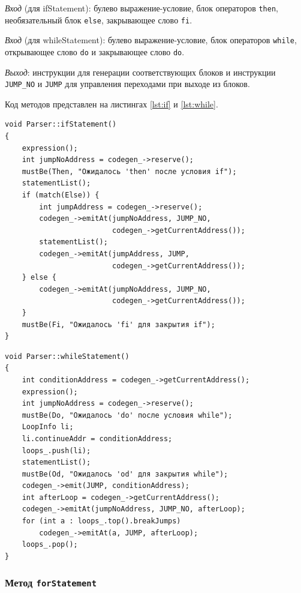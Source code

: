 \documentclass[a4paper,final]{article}
\begin{document}
\textit{Вход} (для ifStatement): булево выражение-условие, блок
операторов \texttt{then}, необязательный блок \texttt{else}, закрывающее
слово \texttt{fi}.

\textit{Вход} (для whileStatement): булево выражение-условие, блок
операторов \texttt{while}, открывающее слово \texttt{do} и закрывающее
слово \texttt{do}.

\textit{Выход}: инструкции для генерации соответствующих блоков и инструкции \texttt{JUMP\_NO} и \texttt{JUMP} для управления переходами при выходе из блоков.

Код методов представлен на листингах \ref{lst:if} и \ref{lst:while}.

\begin{lstlisting}[caption={Метод Parser::ifStatement}, label=lst:if]
void Parser::ifStatement()
{
    expression();
    int jumpNoAddress = codegen_->reserve();
    mustBe(Then, "Ожидалось 'then' после условия if");
    statementList();
    if (match(Else)) {
        int jumpAddress = codegen_->reserve();
        codegen_->emitAt(jumpNoAddress, JUMP_NO,
                         codegen_->getCurrentAddress());
        statementList();
        codegen_->emitAt(jumpAddress, JUMP,
                         codegen_->getCurrentAddress());
    } else {
        codegen_->emitAt(jumpNoAddress, JUMP_NO,
                         codegen_->getCurrentAddress());
    }
    mustBe(Fi, "Ожидалось 'fi' для закрытия if");
}
\end{lstlisting}

\begin{lstlisting}[caption={Метод Parser::whileStatement}, label=lst:while]
void Parser::whileStatement()
{
    int conditionAddress = codegen_->getCurrentAddress();
    expression();
    int jumpNoAddress = codegen_->reserve();
    mustBe(Do, "Ожидалось 'do' после условия while");
    LoopInfo li;
    li.continueAddr = conditionAddress;
    loops_.push(li);
    statementList();
    mustBe(Od, "Ожидалось 'od' для закрытия while");
    codegen_->emit(JUMP, conditionAddress);
    int afterLoop = codegen_->getCurrentAddress();
    codegen_->emitAt(jumpNoAddress, JUMP_NO, afterLoop);
    for (int a : loops_.top().breakJumps)
        codegen_->emitAt(a, JUMP, afterLoop);
    loops_.pop();
}
\end{lstlisting}

\subsubsection*{Метод \texttt{forStatement}}
\end{document}
